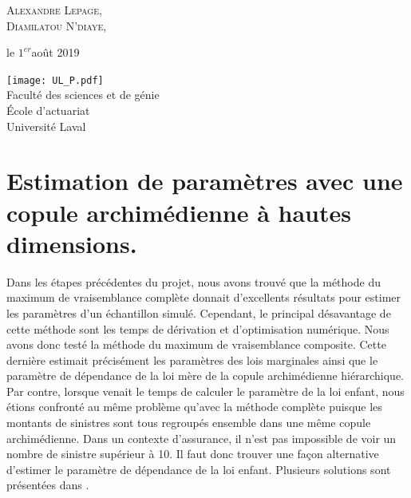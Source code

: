 \documentclass{article}
\begin{document}
\begin{titlepage}
		{\scshape\Large Alexandre Lepage, \\
			Diamilatou N'diaye, \\} %
		
		\vspace*{5\baselineskip}
		
		le $1^{er}$août 2019
		
		\vspace{0.5\baselineskip} %
		
		\vfill %
		
		
		\texttt{[image: UL\_P.pdf]}\\
		
		Faculté des sciences et de génie\\
		École d'actuariat\\
		Université Laval\\     
	\end{titlepage}

	\setcounter{page}{0} 
	
	\newpage
	\strut %
	\newpage
	
	\tableofcontents
	\renewcommand{\listfigurename}{Liste des illustrations}
	\listoffigures
	\newpage
	
	\setcounter{page}{1}
	
	\section{Estimation de paramètres avec une copule archimédienne à hautes dimensions.}
	\label{sect_vrais_haute_dim}
	
	Dans les étapes précédentes du projet, nous avons trouvé que la méthode du maximum de vraisemblance complète donnait d'excellents résultats pour estimer les paramètres d'un échantillon simulé. Cependant, le principal désavantage de cette méthode sont les temps de dérivation et d'optimisation numérique. Nous avons donc testé la méthode du maximum de vraisemblance composite. Cette dernière estimait précisément les paramètres des lois marginales ainsi que le paramètre de dépendance de la loi mère de la copule archimédienne hiérarchique. Par contre, lorsque venait le temps de calculer le paramètre de la loi enfant, nous étions confronté au même problème qu'avec la méthode complète puisque les montants de sinistres sont tous regroupés ensemble dans une même copule archimédienne. Dans un contexte d'assurance, il n'est pas impossible de voir un nombre de sinistre supérieur à 10. Il faut donc trouver une façon alternative d'estimer le paramètre de dépendance de la loi enfant. Plusieurs solutions sont présentées dans \cite{hofert2013ArchimedeanHighDimension}. \\
	
\end{document}
